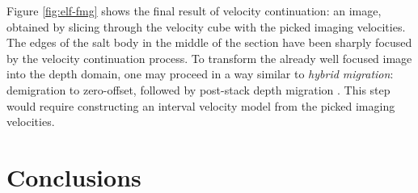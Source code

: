 



Figure \ref{fig:elf-fmg} shows the final result of velocity
continuation: an image, obtained by slicing through the velocity cube
with the picked imaging velocities. The edges of the salt body in the middle
of the section have been sharply focused by the velocity
continuation process. To transform the already well focused image into the
depth domain, one may proceed in a way similar to
\emph{hybrid migration}: demigration to zero-offset, followed by
post-stack depth migration \cite[]{GEO62-02-05680576}. This step
would require constructing an interval velocity model from the picked imaging
velocities.


\begin{comment}
Without repeating the details of the procedure, Figures~\ref{fig:pck}
and \ref{fig:img} show picked imaging velocities and the velocity
continuation image for the Blake Outer Ridge data, shown in many other
papers in this report.


\end{comment}

\section{Conclusions}

